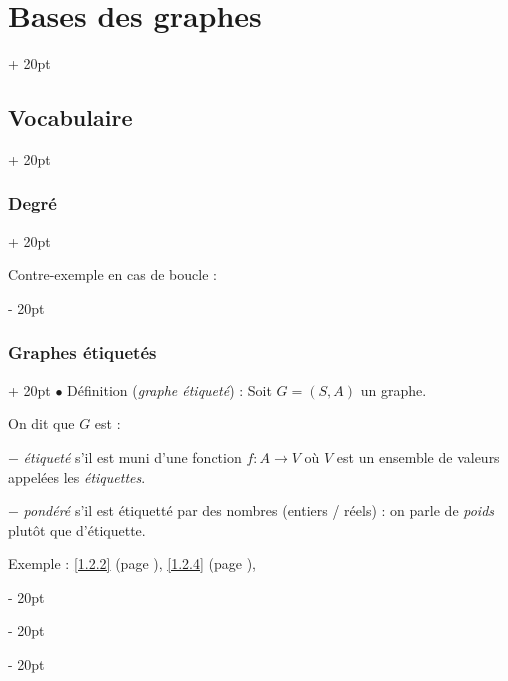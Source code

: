 \documentclass[a4paper, 12pt, twoside]{article}
\newcommand{\ind}[1][20pt]{\advance\leftskip + #1}
\newcommand{\deind}[1][20pt]{\advance\leftskip - #1}
\newenvironment{indt}[2][20pt]{#2 \par \ind[#1]}{\par \deind} %
\begin{document}
\begin{indt}{\section{Bases des graphes}}
\begin{indt}{\subsection{Vocabulaire}}
\begin{indt}{\subsubsection{Degré}}
                \vspace{12pt}

                Contre-exemple en cas de boucle :

                \begin{center}
                \end{center}
            \end{indt}

            \vspace{12pt}
            
            \begin{indt}{\subsubsection{Graphes étiquetés}}
                $\bullet$ Définition (\textit{graphe étiqueté}) : Soit $G = (S, A)$ un graphe.

                On dit que $G$ est :

                $-$ \textit{étiqueté} s'il est muni d'une fonction $f : A \longrightarrow V$ où $V$ est un ensemble de valeurs appelées les \textit{étiquettes}.

                $-$ \textit{pondéré} s'il est étiquetté par des nombres (entiers / réels) : on parle de \textit{poids} plutôt que d'étiquette.

                Exemple : \ref{1.2.2} (page \pageref{1.2.2}), \ref{1.2.4} (page \pageref{1.2.4}),

                \begin{center}
\end{center}
\end{indt}
\end{indt}
\end{indt}
\end{document}
